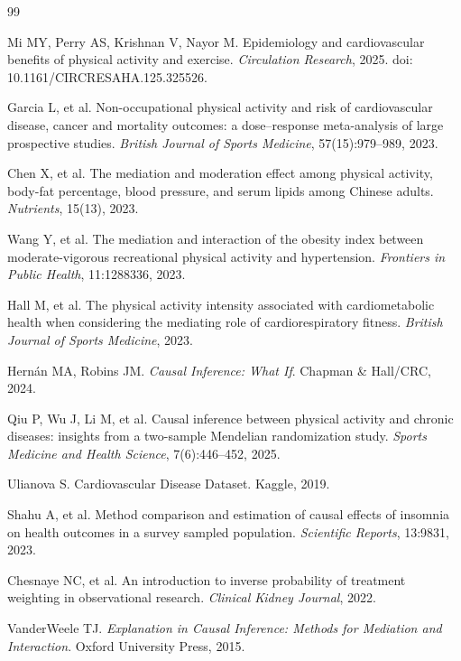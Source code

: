 \documentclass[12pt,a4paper]{article}
\begin{document}
\begin{thebibliography}{99}

Mi MY, Perry AS, Krishnan V, Nayor M.
Epidemiology and cardiovascular benefits of physical activity and exercise.
\textit{Circulation Research}, 2025. doi: 10.1161/CIRCRESAHA.125.325526.

Garcia L, et al.
Non-occupational physical activity and risk of cardiovascular disease, cancer and mortality outcomes: a dose--response meta-analysis of large prospective studies.
\textit{British Journal of Sports Medicine}, 57(15):979--989, 2023.

Chen X, et al.
The mediation and moderation effect among physical activity, body-fat percentage, blood pressure, and serum lipids among Chinese adults.
\textit{Nutrients}, 15(13), 2023.

Wang Y, et al.
The mediation and interaction of the obesity index between moderate-vigorous recreational physical activity and hypertension.
\textit{Frontiers in Public Health}, 11:1288336, 2023.

Hall M, et al.
The physical activity intensity associated with cardiometabolic health when considering the mediating role of cardiorespiratory fitness.
\textit{British Journal of Sports Medicine}, 2023.

Hernán MA, Robins JM.
\textit{Causal Inference: What If}. Chapman \& Hall/CRC, 2024.

Qiu P, Wu J, Li M, et al.
Causal inference between physical activity and chronic diseases: insights from a two-sample Mendelian randomization study.
\textit{Sports Medicine and Health Science}, 7(6):446--452, 2025.

Ulianova S.
Cardiovascular Disease Dataset. Kaggle, 2019.

Shahu A, et al.
Method comparison and estimation of causal effects of insomnia on health outcomes in a survey sampled population.
\textit{Scientific Reports}, 13:9831, 2023.

Chesnaye NC, et al.
An introduction to inverse probability of treatment weighting in observational research.
\textit{Clinical Kidney Journal}, 2022.

VanderWeele TJ.
\textit{Explanation in Causal Inference: Methods for Mediation and Interaction}. Oxford University Press, 2015.


\end{thebibliography}
\end{document}
